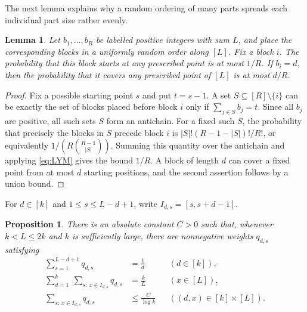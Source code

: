 \documentclass[twoside,12pt]{article}
\numberwithin{equation}{section}
\newtheorem{lemma}[theorem]{Lemma}
\newtheorem{proposition}[theorem]{Proposition}
\begin{document}
The next lemma explains why a random ordering of many parts spreads each
individual part size rather evenly.

\begin{lemma}\label{lem:start-position}
Let $b_1,\ldots,b_R$ be labelled positive integers with sum $L$, and place the
corresponding blocks in a uniformly random order along $[L]$.  Fix a block
$i$.  The probability that this block starts at any prescribed point is at
most $1/R$.  If $b_i=d$, then the probability that it covers any prescribed
point of $[L]$ is at most $d/R$.
\end{lemma}

\begin{proof}
Fix a possible starting point $s$ and put $t=s-1$.  A set
$S\subseteq[R]\setminus\{i\}$ can be exactly the set of blocks placed before
block $i$ only if $\sum_{j\in S}b_j=t$.  Since all $b_j$ are positive, all such
sets $S$ form an antichain.  For a fixed such $S$, the probability that
precisely the blocks in $S$ precede block $i$ is
$|S|!(R-1-|S|)!/R!$, or equivalently $1/(R\binom{R-1}{|S|})$.  Summing this
quantity over the antichain and applying \eqref{eq:LYM} gives the bound
$1/R$.  A block of length $d$ can cover a fixed point from at most $d$ starting
positions, and the second assertion follows by a union bound.
\end{proof}

For $d\in[k]$ and $1\le s\le L-d+1$, write $I_{d,s}=[s,s+d-1]$.

\begin{proposition}\label{prop:fractional-interval}
There is an absolute constant $C>0$ such that, whenever $k<L\le2k$ and $k$ is
sufficiently large, there are nonnegative weights $q_{d,s}$ satisfying
\begin{align}
 \sum_{s=1}^{L-d+1}q_{d,s}&=\frac1d
        &&(d\in[k]),\label{eq:q-color}\\
 \sum_{d=1}^k\ \sum_{s:\,x\in I_{d,s}}q_{d,s}&=\frac{k}{L}
        &&(x\in[L]),\label{eq:q-load}\\
 \sum_{s:\,x\in I_{d,s}}q_{d,s}&\le\frac{C}{\log k}
        &&((d,x)\in[k]\times[L]).\label{eq:q-diffuse}
\end{align}
\end{proposition}
\end{document}
